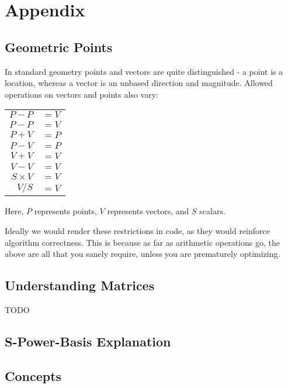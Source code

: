 \documentclass{book}
\begin{document}
\chapter{Appendix}
\renewcommand{\thesection}{\Alph{section}}

\section{Geometric Points}
In standard geometry points and vectors are quite distinguished - a  
point is a location, whereas a vector is an unbased direction and
magnitude.  Allowed operations on vectors and points also vary:

\begin{tabular}{r l}
  $P - P$ & $= V$ \\

  $P - P$ & $= V$ \\

  $P + V$ & $= P$ \\

  $P - V$ & $= P$ \\

  $V + V$ & $= V$ \\

  $V - V$ & $= V$ \\

  $S \times V$ & $= V$ \\

  $V / S$ & $= V$ \\
\end{tabular}

Here, $P$ represents points, $V$ represents vectors, and $S$ scalars.

Ideally we would render these restrictions in code, as they would
reinforce algorithm correctness.  This is because as far as arithmetic
operations go, the above are all that you sanely require, unless you
are prematurely optimizing.

\section{Understanding Matrices}

TODO

\section{S-Power-Basis Explanation}

\section{Concepts}
\end{document}
